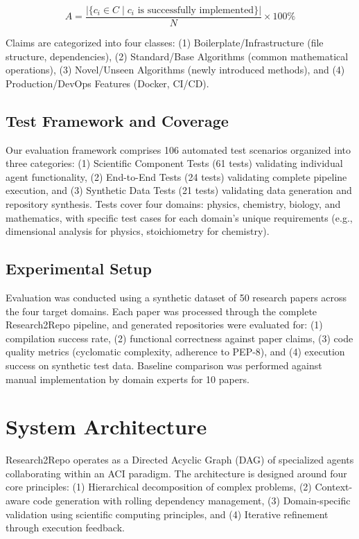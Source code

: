 \documentclass[10pt]{article}
\begin{document}
$$A = \frac{|\{c_i \in C \mid c_i \text{ is successfully implemented}\}|}{N} \times 100\%$$

Claims are categorized into four classes: (1) Boilerplate/Infrastructure (file structure, dependencies), (2) Standard/Base Algorithms (common mathematical operations), (3) Novel/Unseen Algorithms (newly introduced methods), and (4) Production/DevOps Features (Docker, CI/CD).

\subsection{Test Framework and Coverage}

Our evaluation framework comprises 106 automated test scenarios organized into three categories: (1) Scientific Component Tests (61 tests) validating individual agent functionality, (2) End-to-End Tests (24 tests) validating complete pipeline execution, and (3) Synthetic Data Tests (21 tests) validating data generation and repository synthesis. Tests cover four domains: physics, chemistry, biology, and mathematics, with specific test cases for each domain's unique requirements (e.g., dimensional analysis for physics, stoichiometry for chemistry).

\subsection{Experimental Setup}

Evaluation was conducted using a synthetic dataset of 50 research papers across the four target domains. Each paper was processed through the complete Research2Repo pipeline, and generated repositories were evaluated for: (1) compilation success rate, (2) functional correctness against paper claims, (3) code quality metrics (cyclomatic complexity, adherence to PEP-8), and (4) execution success on synthetic test data. Baseline comparison was performed against manual implementation by domain experts for 10 papers.

\section{System Architecture}

Research2Repo operates as a Directed Acyclic Graph (DAG) of specialized agents collaborating within an ACI paradigm. The architecture is designed around four core principles: (1) Hierarchical decomposition of complex problems, (2) Context-aware code generation with rolling dependency management, (3) Domain-specific validation using scientific computing principles, and (4) Iterative refinement through execution feedback.
\end{document}
